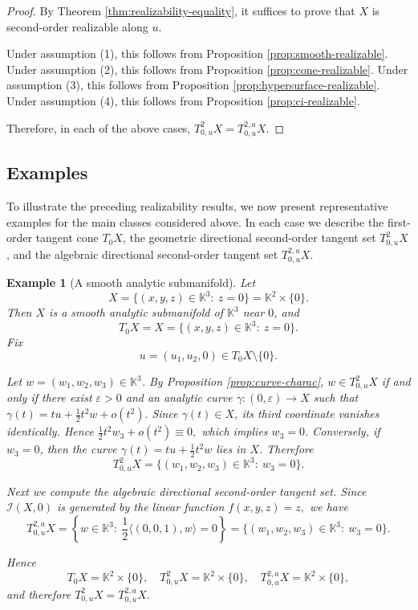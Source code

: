 \documentclass[10pt,reqno]{amsart}
\theoremstyle{break-italic}
\theoremstyle{break-italic}
\theoremstyle{break-italic}
\theoremstyle{break-italic}
\theoremstyle{break-italic}
\theoremstyle{break-italic}
\theoremstyle{break-italic}
\theoremstyle{break-italic}
\theoremstyle{break-roman}
\newtheorem{example}[satz]{Example}
\theoremstyle{standard}
\theoremstyle{varthm-roman}
\theoremstyle{varthm-italic}
\theoremstyle{varthm-roman-break}
\theoremstyle{varthm-italic-break}
\theoremstyle{varthm-roman-no-punctuation}
\theoremstyle{varthm-italic-no-punctuation}
\numberwithin{equation}{section}
\begin{document}
\begin{proof}
By Theorem \ref{thm:realizability-equality}, it suffices to prove that $X$ is second-order realizable along $u$.

Under assumption {\rm(1)}, this follows from Proposition \ref{prop:smooth-realizable}. 
Under assumption {\rm(2)}, this follows from Proposition \ref{prop:cone-realizable}.
Under assumption {\rm(3)}, this follows from Proposition \ref{prop:hypersurface-realizable}.
Under assumption {\rm(4)}, this follows from Proposition \ref{prop:ci-realizable}.

Therefore, in each of the above cases,
\(
T^2_{0,u}X=T^{2,a}_{0,u}X.
\)
\end{proof}


\subsection{Examples}

To illustrate the preceding realizability results, we now present representative
examples for the main classes considered above. In each case we describe the
first-order tangent cone $T_0X$, the geometric directional second-order tangent
set $T^2_{0,u}X$, and the algebraic directional second-order tangent set
$T^{2,a}_{0,u}X$.

\begin{example}[A smooth analytic submanifold]\label{ex:smooth}
Let
\[
X=\{(x,y,z)\in \mathbb K^3:\ z=0\}=\mathbb K^2\times\{0\}.
\]
Then $X$ is a smooth analytic submanifold of $\mathbb K^3$ near $0$, and
\[
T_0X=X=\{(x,y,z)\in \mathbb K^3:\ z=0\}.
\]
Fix
\[
u=(u_1,u_2,0)\in T_0X\setminus\{0\}.
\]

Let $w=(w_1,w_2,w_3)\in\mathbb K^3$. By Proposition \ref{prop:curve-charac},
$w\in T^2_{0,u}X$ if and only if there exist $\varepsilon>0$ and an analytic
curve
\(
\gamma:(0,\varepsilon)\to X
\)
such that
\(
\gamma(t)=tu+\frac12 t^2w+o(t^2).
\)
Since $\gamma(t)\in X$, its third coordinate vanishes identically. Hence
\(
\frac12 t^2w_3+o(t^2)\equiv 0,
\)
which implies $w_3=0$. Conversely, if $w_3=0$, then the curve
\(
\gamma(t)=tu+\frac12 t^2w
\)
lies in $X$. Therefore
\[
T^2_{0,u}X=\{(w_1,w_2,w_3)\in \mathbb K^3:\ w_3=0\}.
\]

Next we compute the algebraic directional second-order tangent set. Since
$\mathcal{I}(X,0)$ is generated by the linear function
\(
f(x,y,z)=z,
\)
we have
\[
T^{2,a}_{0,u}X
=
\left\{
w\in \mathbb K^3:\ \frac12\langle (0,0,1),w\rangle =0
\right\}
=
\{(w_1,w_2,w_3)\in \mathbb K^3:\ w_3=0\}.
\]

Hence
\[
T_0X=\mathbb K^2\times\{0\},
\quad
T^2_{0,u}X=\mathbb K^2\times\{0\},
\quad
T^{2,a}_{0,u}X=\mathbb K^2\times\{0\},
\]
and therefore
\(
T^2_{0,u}X=T^{2,a}_{0,u}X.
\)
\end{example}
\end{document}
